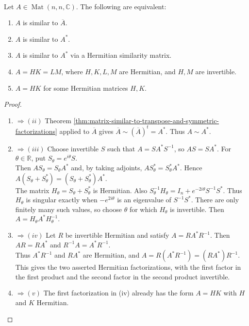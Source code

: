 \begin{theorem} \label{thm:conjugate-similarity-hermitian-product-equivalences} \\
Let $A\in\operatorname{Mat}(n,n,\mathbb{C})$. The following are equivalent:
\begin{enumerate}[label=(\roman*)]
\setlength{\itemsep}{0pt}
\item $A$ is similar to $\overline{A}$.
\item $A$ is similar to $A^*$.
\item $A$ is similar to $A^*$ via a Hermitian similarity matrix.
\item $A=HK=LM$, where $H,K,L,M$ are Hermitian, and $H,M$ are invertible.
\item $A=HK$ for some Hermitian matrices $H,K$.
\end{enumerate}
\begin{proof}
\begin{enumerate}[label=\roman*.]
\setlength{\itemsep}{0pt}
\item[$(i)$]$\Rightarrow(ii)$ Theorem \ref{thm:matrix-similar-to-transpose-and-symmetric-factorizations} applied to $\overline{A}$ gives $\overline{A}\sim(\overline{A})^t=A^*$. Thus $A\sim A^*$.
\item[$(ii)$]$\Rightarrow(iii)$ Choose invertible $S$ such that $A=SA^*S^{-1}$, so $AS=SA^*$. For $\theta\in\mathbb{R}$, put $S_{\theta}=e^{i\theta}S$.\\
Then $AS_{\theta}=S_{\theta}A^*$ and, by taking adjoints, $AS_{\theta}^*=S_{\theta}^*A^*$. Hence $A(S_{\theta}+S_{\theta}^*)=(S_{\theta}+S_{\theta}^*)A^*$.\\
The matrix $H_{\theta}=S_{\theta}+S_{\theta}^*$ is Hermitian. Also $S_{\theta}^{-1}H_{\theta}=I_n+e^{-2i\theta}S^{-1}S^*$. Thus $H_{\theta}$ is singular exactly when $-e^{2i\theta}$ is an eigenvalue of $S^{-1}S^*$. There are only finitely many such values, so choose $\theta$ for which $H_{\theta}$ is invertible. Then $A=H_{\theta}A^*H_{\theta}^{-1}$.
\item[$(iii)$]$\Rightarrow(iv)$ Let $R$ be invertible Hermitian and satisfy $A=RA^*R^{-1}$. Then $AR=RA^*$ and $R^{-1}A=A^*R^{-1}$.\\
Thus $A^*R^{-1}$ and $RA^*$ are Hermitian, and $A=R(A^*R^{-1})=(RA^*)R^{-1}$.\\
This gives the two asserted Hermitian factorizations, with the first factor in the first product and the second factor in the second product invertible.
\item[$(iv)$]$\Rightarrow(v)$ The first factorization in (iv) already has the form $A=HK$ with $H$ and $K$ Hermitian.

\end{enumerate}
\end{proof}
\end{theorem}
